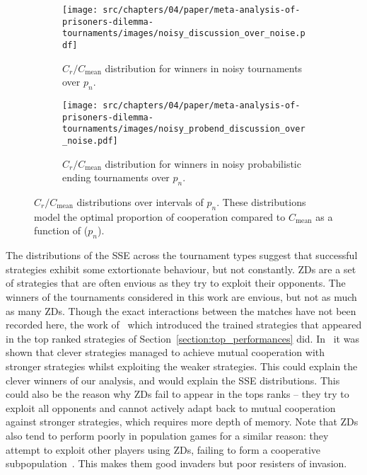 \begin{figure}[!htbp]
    \centering
    \begin{subfigure}{0.485\textwidth}
        \centering
        \texttt{[image: src/chapters/04/paper/meta-analysis-of-prisoners-dilemma-tournaments/images/noisy\_discussion\_over\_noise.pdf]}
        \caption{\(C_r / C_{\text{mean}}\) distribution for winners in noisy tournaments over
        \(p_n\).}\label{fig:noisy_discussion_over_noise}
    \end{subfigure}
    \hfill
    \begin{subfigure}{0.485\textwidth}
        \centering
        \texttt{[image: src/chapters/04/paper/meta-analysis-of-prisoners-dilemma-tournaments/images/noisy\_probend\_discussion\_over\_noise.pdf]}
        \caption{\(C_r / C_{\text{mean}}\) distribution for winners in noisy probabilistic ending tournaments over
        \(p_n\).}\label{fig:noisy_probend_discussion_over_noise}
    \end{subfigure}
    \caption{\(C_r / C_{\text{mean}}\) distributions over intervals of \(p_n\).
    These distributions model the optimal proportion of cooperation
    compared to \(C_{\text{mean}}\) as a function of (\(p_n\)).}
    \label{fig:compared_to_mean_over_noise_probability}
\end{figure}

The distributions of the SSE across the tournament types suggest that successful
strategies exhibit some extortionate behaviour, but not constantly.
ZDs are a set of strategies that are often envious as they try to exploit their
opponents. The winners of the tournaments considered in this work are
envious, but not as much as many ZDs.
Though the exact interactions between the matches have not been recorded here,
the work of~\cite{Harper2017} which introduced the trained strategies that
appeared in the top ranked strategies of Section~\ref{section:top_performances}
did. In~\cite{Harper2017} it was shown that clever strategies managed to achieve
mutual cooperation with stronger strategies whilst exploiting the weaker
strategies. This could explain the clever winners
of our analysis, and would explain the SSE distributions. This could also
be the reason why ZDs fail to appear in the tops ranks -- they try to exploit
all opponents and cannot actively adapt back to mutual cooperation against
stronger strategies, which requires more depth of memory. Note that
ZDs also tend to perform poorly in population games for a similar reason: they
attempt to exploit other players using ZDs, failing to form a cooperative
subpopulation~\cite{Knight2017evolution}. This makes them good invaders but poor resisters of invasion.

